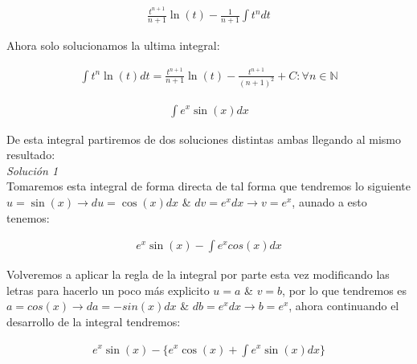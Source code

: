 \begin{equation*}
    \begin{gathered}
        \frac{t^{n+1}}{n+1}\ln(t)-\frac{1}{n+1}\int t^{n}dt
    \end{gathered}
\end{equation*}

Ahora solo solucionamos la ultima integral:

\begin{equation*}
    \begin{gathered}
        \int t^{n}\ln(t)dt = \frac{t^{n+1}}{n+1}\ln(t)-\frac{t^{n+1}}{(n+1)^{2}} + C \colon \forall n \in \mathbb{N}
    \end{gathered}
\end{equation*}

\vspace{1cm}
\begin{equation}
    \begin{gathered}
        \int e^{x}\sin(x)dx
    \end{gathered}
\end{equation}

De esta integral partiremos de dos soluciones distintas ambas llegando al mismo resultado:\\

\textit{Solución 1}\\

Tomaremos esta integral de forma directa de tal forma que tendremos lo siguiente \(\displaystyle u=\sin(x)\rightarrow du= \cos(x)dx\) \& \(\displaystyle dv=e^{x}dx \rightarrow v=e^{x}\), aunado a esto tenemos:

\begin{equation*}
    \begin{gathered}
        e^{x}\sin(x) - \int e^{x}cos(x)dx 
    \end{gathered}
\end{equation*}

Volveremos a aplicar la regla de la integral por parte esta vez modificando las letras para hacerlo un poco más explicito \(\displaystyle u=a\) \& \(\displaystyle v=b\), por lo que tendremos es \(\displaystyle a=cos(x) \rightarrow da=-sin(x)dx\) \& \(\displaystyle db=e^{x}dx \rightarrow b=e^{x}\), ahora continuando el desarrollo de la integral tendremos:

\begin{equation*}
    \begin{gathered}
        e^{x}\sin(x)-\{e^{x}\cos(x)+\int e^{x}\sin(x)dx\}
    \end{gathered}
\end{equation*}

